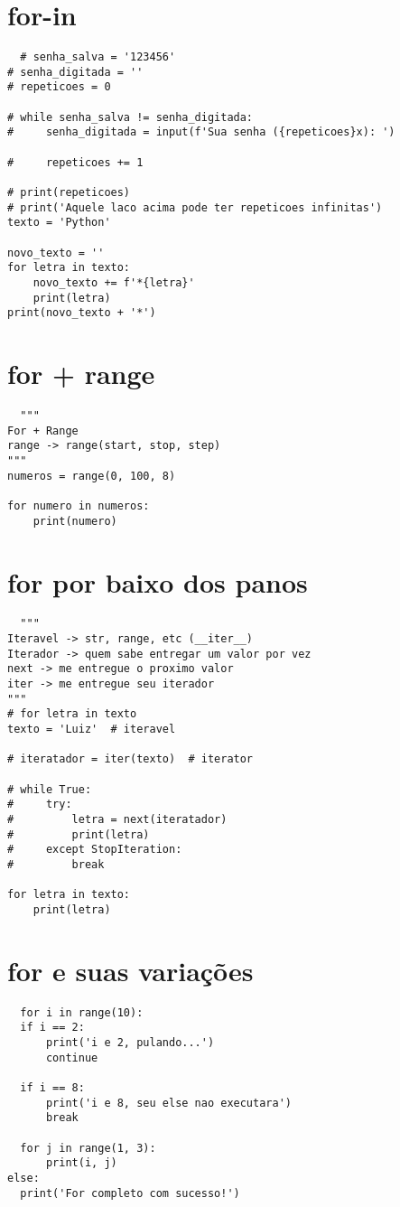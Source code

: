 \documentclass[16pts]{article}
\begin{document}
\section{for-in}
\begin{lstlisting}
  # senha_salva = '123456'
# senha_digitada = ''
# repeticoes = 0

# while senha_salva != senha_digitada:
#     senha_digitada = input(f'Sua senha ({repeticoes}x): ')

#     repeticoes += 1

# print(repeticoes)
# print('Aquele laco acima pode ter repeticoes infinitas')
texto = 'Python'

novo_texto = ''
for letra in texto:
    novo_texto += f'*{letra}'
    print(letra)
print(novo_texto + '*')
\end{lstlisting}
\section{for + range}
\begin{lstlisting}
  """
For + Range
range -> range(start, stop, step)
"""
numeros = range(0, 100, 8)

for numero in numeros:
    print(numero)
\end{lstlisting}
\section{for por baixo dos panos}
\begin{lstlisting}
  """
Iteravel -> str, range, etc (__iter__)
Iterador -> quem sabe entregar um valor por vez
next -> me entregue o proximo valor
iter -> me entregue seu iterador
"""
# for letra in texto
texto = 'Luiz'  # iteravel

# iteratador = iter(texto)  # iterator

# while True:
#     try:
#         letra = next(iteratador)
#         print(letra)
#     except StopIteration:
#         break

for letra in texto:
    print(letra)
\end{lstlisting}
\section{for e suas variações}
\begin{lstlisting}
  for i in range(10):
  if i == 2:
      print('i e 2, pulando...')
      continue

  if i == 8:
      print('i e 8, seu else nao executara')
      break

  for j in range(1, 3):
      print(i, j)
else:
  print('For completo com sucesso!') 
\end{lstlisting}
\end{document}
